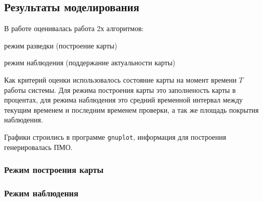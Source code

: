 \subsection{Результаты моделирования}

В работе оценивалась работа 2х алгоритмов:
\begin{mintemize}
\item режим разведки (построение карты)
\item режим наблюдения (поддержание актуальности карты)
\end{mintemize}

Как критерий оценки использовалось состояние карты на момент
времени $T$ работы системы. Для режима построения карты это
заполненость карты в процентах, для режима наблюдения это
средний временной интервал между текущим временем и последним
временем проверки, а так же площадь покрытия наблюдения.

Графики строились в программе \verb|gnuplot|, информация для
построения генерировалась ПМО.

\newpage
\subsubsection{Режим построения карты}

\newpage
\subsubsection{Режим наблюдения}
